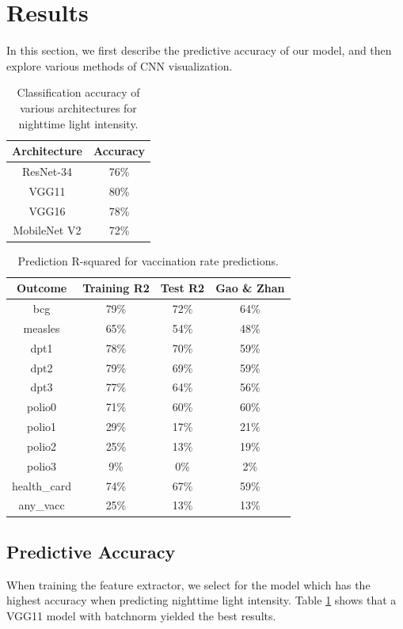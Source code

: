 \documentclass[]{article}
\begin{document}
\section{Results}
In this section, we first describe the predictive accuracy of our model, and then explore various methods of CNN visualization.

\begin{table}[t!]
\centering
\begin{tabular}{c | c}
\hline
Architecture & Accuracy \\
\hline
ResNet-34 & 76\% \\
VGG11 & 80\% \\
VGG16 & 78\% \\
MobileNet V2 & 72\% \\
\hline
\end{tabular}
\caption{Classification accuracy of various architectures for nighttime light intensity.}
\label{table:extractor}
\end{table}

\begin{table}[t!]
\centering
\begin{tabular}{c | c c | c}
\hline
Outcome & Training R2 & Test R2 & Gao \& Zhan \\
\hline
bcg&79\%&72\%&64\%\\
measles&65\%&54\%&48\%\\
dpt1&78\%&70\%&59\%\\
dpt2&79\%&69\%&59\%\\
dpt3&77\%&64\%&56\%\\
polio0&71\%&60\%&60\%\\
polio1&29\%&17\%&21\%\\
polio2&25\%&13\%&19\%\\
polio3&9\%&0\%&2\%\\
health\_card&74\%&67\%&59\%\\
any\_vacc&25\%&13\%&13\%\\
\hline
\end{tabular}
\caption{Prediction R-squared for vaccination rate predictions. }
\label{table:predictor}
\end{table}


\subsection{Predictive Accuracy}
When training the feature extractor, we select for the model which has the highest accuracy when predicting nighttime light intensity. Table \ref{table:extractor} shows that a VGG11 model with batchnorm yielded the best results.
\end{document}

